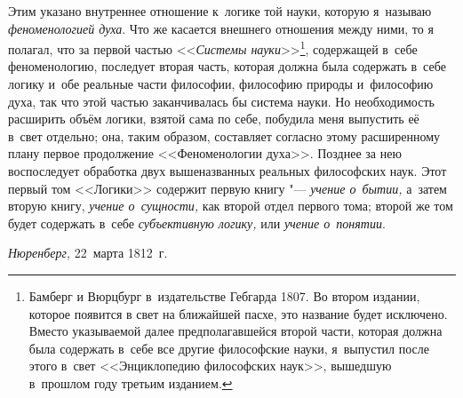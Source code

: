 Этим указано внутреннее отношение к~логике той науки, которую я~называю
{\em феноменологией духа}. Что же касается внешнего отношения между ними, то я
полагал, что за первой частью <<{\em Системы науки}>>\footnote{Бамберг и
Вюрцбург в~издательстве Гебгарда 1807. Во втором издании, которое появится в
свет на ближайшей пасхе, это название будет исключено. Вместо указываемой далее
предполагавшейся второй части, которая должна была содержать в~себе все другие
философские науки, я~выпустил после этого в~свет <<Энциклопедию философских
наук>>, вышедшую в~прошлом году третьим изданием.}, содержащей в~себе
феноменологию, последует вторая часть, которая должна была содержать в~себе
логику и~обе реальные части философии, философию природы и~философию духа, так
что этой частью заканчивалась бы система науки. Но необходимость расширить
объём логики, взятой сама по себе, побудила меня выпустить её в~свет отдельно;
она, таким образом, составляет согласно этому расширенному плану первое
продолжение <<Феноменологии духа>>. Позднее за нею воспоследует обработка двух
вышеназванных реальных философских наук. Этот первый том <<Логики>> содержит
первую книгу "--- {\em учение о~бытии,} а~затем вторую книгу,
{\em учение о~сущности,} как второй отдел первого тома; второй же том будет
содержать в~себе {\em субъективную логику,} или {\em учение о~понятии}.

{\em Нюренберг,} 22~марта 1812~г.
